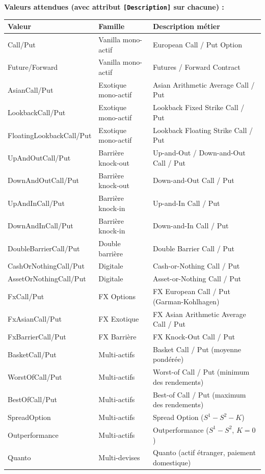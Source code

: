 \documentclass[a4paper,11pt]{article}
\newcommand{\cs}[1]{\texttt{\color{codeinline}#1}}
\begin{document}
\textbf{Valeurs attendues (avec attribut \cs{[Description]} sur chacune) :}
\begin{center}
\begin{tabularx}{1.1\textwidth}{>{\ttfamily}l l l}
\toprule
\textbf{Valeur} & \textbf{Famille} & \textbf{Description m\'etier} \\
\midrule
Call/Put & Vanilla mono-actif & European Call / Put Option \\
Future/Forward & Vanilla mono-actif & Futures / Forward Contract \\
AsianCall/Put & Exotique mono-actif & Asian Arithmetic Average Call / Put \\
LookbackCall/Put & Exotique mono-actif & Lookback Fixed Strike Call / Put \\
FloatingLookbackCall/Put & Exotique mono-actif & Lookback Floating Strike Call / Put \\
UpAndOutCall/Put & Barri\`ere knock-out & Up-and-Out / Down-and-Out Call / Put \\
DownAndOutCall/Put & Barri\`ere knock-out & Down-and-Out Call / Put \\
UpAndInCall/Put & Barri\`ere knock-in & Up-and-In Call / Put \\
DownAndInCall/Put & Barri\`ere knock-in & Down-and-In Call / Put \\
DoubleBarrierCall/Put & Double barri\`ere & Double Barrier Call / Put \\
CashOrNothingCall/Put & Digitale & Cash-or-Nothing Call / Put \\
AssetOrNothingCall/Put & Digitale & Asset-or-Nothing Call / Put \\
FxCall/Put & FX Options & FX European Call / Put (Garman-Kohlhagen) \\
FxAsianCall/Put & FX Exotique & FX Asian Arithmetic Average Call / Put \\
FxBarrierCall/Put & FX Barri\`ere & FX Knock-Out Call / Put \\
BasketCall/Put & Multi-actifs & Basket Call / Put (moyenne pond\'er\'ee) \\
WorstOfCall/Put & Multi-actifs & Worst-of Call / Put (minimum des rendements) \\
BestOfCall/Put & Multi-actifs & Best-of Call / Put (maximum des rendements) \\
SpreadOption & Multi-actifs & Spread Option ($S^1 - S^2 - K$) \\
Outperformance & Multi-actifs & Outperformance ($S^1 - S^2$, $K=0$) \\
Quanto & Multi-devises & Quanto (actif \'etranger, paiement domestique) \\

\end{tabularx}
\end{center}
\end{document}
